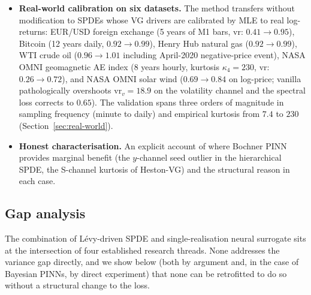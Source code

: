 \documentclass[review,12pt]{elsarticle}
\begin{document}
\begin{itemize}
\item \textbf{Real-world calibration on six datasets.} The method
transfers without modification to SPDEs whose VG drivers are
calibrated by MLE to real log-returns: EUR/USD foreign exchange (5
years of M1 bars, vr: \(0.41 \to 0.95\)), Bitcoin (12 years daily,
\(0.92 \to 0.99\)), Henry Hub natural gas (\(0.92 \to 0.99\)), WTI
crude oil (\(0.96 \to 1.01\) including April-2020 negative-price
event), NASA OMNI geomagnetic AE index (8 years hourly, kurtosis
\(\kappa_4 = 230\), vr: \(0.26 \to 0.72\)), and NASA OMNI solar wind
(\(0.69 \to 0.84\) on log-price; vanilla pathologically overshoots
\(\mathrm{vr}_v = 18.9\) on the volatility channel and the spectral
loss corrects to \(0.65\)). The validation spans three orders of
magnitude in sampling frequency (minute to daily) and empirical
kurtosis from \(7.4\) to \(230\) (Section~\ref{sec:real-world}).

\item \textbf{Honest characterisation.} An explicit account of where
Bochner PINN provides marginal benefit (the \(y\)-channel seed
outlier in the hierarchical SPDE, the S-channel kurtosis of Heston-VG)
and the structural reason in each case.
\end{itemize}

\subsection{Gap analysis}
\label{subsec:gap-analysis}

The combination of L\'evy-driven SPDE and single-realisation neural
surrogate sits at the intersection of four established research
threads. None addresses the variance gap directly, and we show below
(both by argument and, in the case of Bayesian PINNs, by direct
experiment) that none can be retrofitted to do so without a
structural change to the loss.
\end{document}

